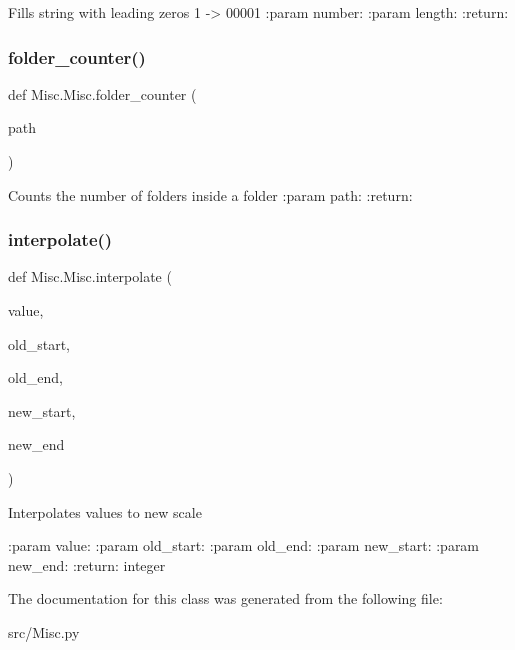 \begin{DoxyVerb}Fills string with leading zeros 1 -> 00001
:param number:
:param length:
:return:
\end{DoxyVerb}
 \mbox{\label{class_misc_1_1_misc_a8d30d14e25c28f7f8ac3798e501d4aaa}} 
\subsubsection{\texorpdfstring{folder\+\_\+counter()}{folder\_counter()}}
{\footnotesize\ttfamily def Misc.\+Misc.\+folder\+\_\+counter (\begin{DoxyParamCaption}\item[{}]{path }\end{DoxyParamCaption})\hspace{0.3cm}{\ttfamily [static]}}

\begin{DoxyVerb}Counts the number of folders inside a folder
:param path:
:return:
\end{DoxyVerb}
 \mbox{\label{class_misc_1_1_misc_a13003135b0176722b987635ea8a52746}} 
\subsubsection{\texorpdfstring{interpolate()}{interpolate()}}
{\footnotesize\ttfamily def Misc.\+Misc.\+interpolate (\begin{DoxyParamCaption}\item[{}]{value,  }\item[{}]{old\+\_\+start,  }\item[{}]{old\+\_\+end,  }\item[{}]{new\+\_\+start,  }\item[{}]{new\+\_\+end }\end{DoxyParamCaption})\hspace{0.3cm}{\ttfamily [static]}}

\begin{DoxyVerb}Interpolates values to new scale

:param value:
:param old_start:
:param old_end:
:param new_start:
:param new_end:
:return: integer
\end{DoxyVerb}
 

The documentation for this class was generated from the following file\+:\begin{DoxyCompactItemize}
\item 
src/Misc.\+py\end{DoxyCompactItemize}
